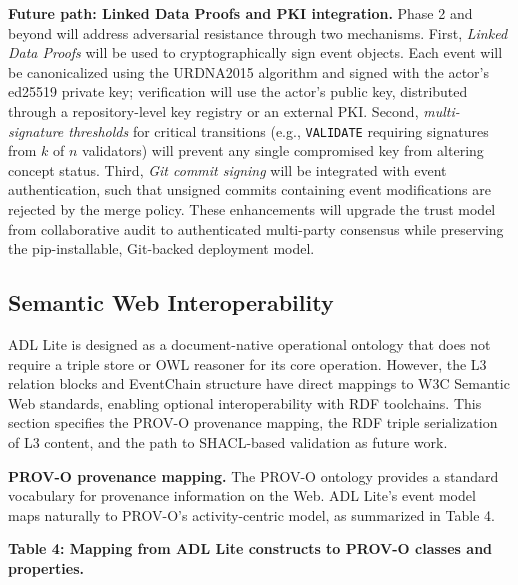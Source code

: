 \textbf{Future path: Linked Data Proofs and PKI integration.} Phase 2 and beyond will address adversarial resistance through two mechanisms. First, \emph{Linked Data Proofs} \cite{ref21} will be used to cryptographically sign event objects. Each event will be canonicalized using the URDNA2015 algorithm and signed with the actor's ed25519 private key; verification will use the actor's public key, distributed through a repository-level key registry or an external PKI. Second, \emph{multi-signature thresholds} for critical transitions (e.g., \texttt{VALIDATE} requiring signatures from \(k\) of \(n\) validators) will prevent any single compromised key from altering concept status. Third, \emph{Git commit signing} will be integrated with event authentication, such that unsigned commits containing event modifications are rejected by the merge policy. These enhancements will upgrade the trust model from collaborative audit to authenticated multi-party consensus while preserving the pip-installable, Git-backed deployment model.

\subsection{Semantic Web Interoperability}\label{semantic-web-interoperability}

ADL Lite is designed as a document-native operational ontology that does not require a triple store or OWL reasoner for its core operation. However, the L3 relation blocks and EventChain structure have direct mappings to W3C Semantic Web standards, enabling optional interoperability with RDF toolchains. This section specifies the PROV-O provenance mapping, the RDF triple serialization of L3 content, and the path to SHACL-based validation as future work.

\textbf{PROV-O provenance mapping.} The PROV-O ontology \cite{ref22} provides a standard vocabulary for provenance information on the Web. ADL Lite's event model maps naturally to PROV-O's activity-centric model, as summarized in Table 4.

\textbf{Table 4: Mapping from ADL Lite constructs to PROV-O classes and properties.}

